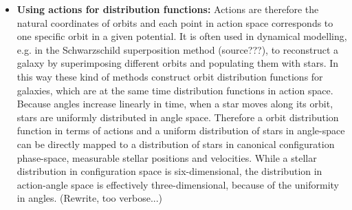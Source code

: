 \begin{itemize}
\item \textbf{Using actions for distribution functions:} Actions are therefore the natural coordinates of orbits and each point in action space corresponds to one specific orbit in a given potential. It is often used in dynamical modelling, e.g. in the Schwarzschild superposition method (source???), to reconstruct a galaxy by superimposing different orbits and populating them with stars. In this way these kind of methods construct orbit distribution functions for galaxies, which are at the same time distribution functions in action space. Because angles increase linearly in time, when a star moves along its orbit, stars are uniformly distributed in angle space. Therefore a orbit distribution function in terms of actions and a uniform distribution of stars in angle-space can be directly mapped to a distribution of stars in canonical configuration phase-space, measurable stellar positions and velocities. While a stellar distribution in configuration space is six-dimensional, the distribution in action-angle space is effectively three-dimensional, because of the uniformity in angles. (Rewrite, too verbose...)


\end{itemize}
